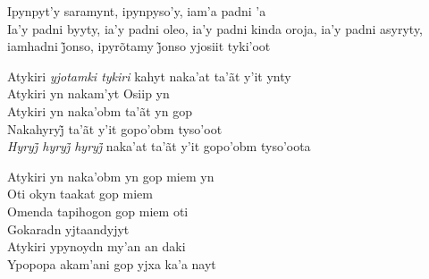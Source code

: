 \bigskip

\begin{linenumbers}\begingroup\raggedright
 
\noindent   Ipynpyt'y saramynt, ipynpyso'y, iam'a padni 'a\\
  Ia’y padni byyty, ia’y padni oleo, ia’y padni kinda oroja, ia’y padni asyryty, iamhadni j̃onso, ipyrõtamy j̃onso yjosiit tyki’oot
 
\end{linenumbers}\endgroup

\bigskip

\begin{linenumbers}\begingroup\raggedright
 
\noindent   Atykiri \emph{yjotamki tykiri} kahyt naka'at ta'ãt y'it ynty\\
  Atykiri yn nakam'yt Osiip yn\\
  Atykiri yn naka'obm ta'ãt yn gop\\
  Nakahyryj̃ ta’ãt y’it gopo’obm tyso’oot\\
  \emph{Hyryj̃ hyryj̃ hyryj̃ }naka’at ta’ãt y’it gopo’obm tyso’oota
 
\end{linenumbers}\endgroup

\bigskip

\begin{linenumbers}\begingroup\raggedright
 
\noindent   Atykiri yn naka'obm yn gop miem yn\\
  Oti okyn taakat gop miem\\
  Omenda tapihogon gop miem oti\\
  Gokaradn yjtaandyjyt\\
  Atykiri ypynoydn my'an an daki\\
  Ypopopa akam'ani gop yjxa ka'a nayt
 
\end{linenumbers}\endgroup

